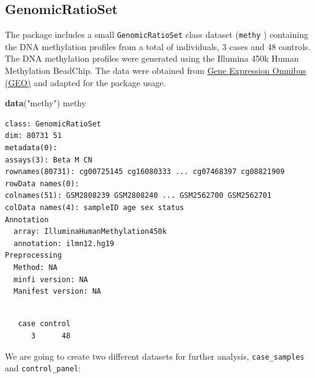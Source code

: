 \documentclass[
]{article}
\newenvironment{Shaded}{\begin{snugshade}}{\end{snugshade}}
\newcommand{\KeywordTok}[1]{\textcolor[rgb]{0.13,0.29,0.53}{\textbf{#1}}}
\newcommand{\NormalTok}[1]{#1}
\newcommand{\OperatorTok}[1]{\textcolor[rgb]{0.81,0.36,0.00}{\textbf{#1}}}
\newcommand{\StringTok}[1]{\textcolor[rgb]{0.31,0.60,0.02}{#1}}
\begin{document}
\hypertarget{genomicratioset}{%
\subsection{GenomicRatioSet}\label{genomicratioset}}

The package includes a small \texttt{GenomicRatioSet} class dataset
(\texttt{methy} ) containing the DNA methylation profiles from a total
of individuals, 3 cases and 48 controls. The DNA methylation profiles
were generated using the Illumina 450k Human Methylation BeadChip. The
data were obtained from \href{https://www.ncbi.nlm.nih.gov/geo/}{Gene
Expression Omnibus (GEO)} and adapted for the package usage.

\begin{Shaded}
\begin{Highlighting}[]
\KeywordTok{data}\NormalTok{(}\StringTok{"methy"}\NormalTok{)}
\NormalTok{methy}
\end{Highlighting}
\end{Shaded}

\begin{verbatim}
class: GenomicRatioSet 
dim: 80731 51 
metadata(0):
assays(3): Beta M CN
rownames(80731): cg00725145 cg16080333 ... cg07468397 cg08821909
rowData names(0):
colnames(51): GSM2808239 GSM2808240 ... GSM2562700 GSM2562701
colData names(4): sampleID age sex status
Annotation
  array: IlluminaHumanMethylation450k
  annotation: ilmn12.hg19
Preprocessing
  Method: NA
  minfi version: NA
  Manifest version: NA
\end{verbatim}

\begin{Shaded}
\end{Shaded}

\begin{verbatim}

   case control 
      3      48 
\end{verbatim}

We are going to create two different datasets for further analysis,
\texttt{case\_samples} and \texttt{control\_panel}:

\begin{Shaded}
\end{Shaded}
\end{document}
